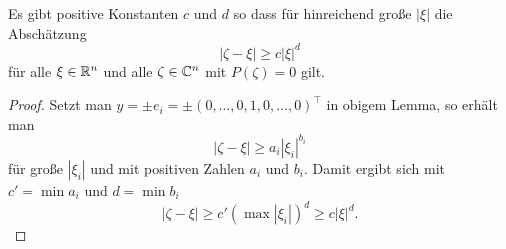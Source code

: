\begin{cor}\label{3.2lem2}
Es gibt positive Konstanten $c$ und $d$ so dass für hinreichend große $|\xi|$ die Abschätzung 
\begin{equation}
|\zeta- \xi|\ge c |\xi|^{d}
\end{equation} 
für alle $\xi\in\mathbb R^n$ und alle $\zeta\in\mathbb C^n$ mit $P(\zeta)=0$ gilt.
\end{cor} 
\begin{proof}
Setzt man $y=\pm e_i=\pm(0,\ldots, 0, 1, 0, \ldots, 0)^\top$ in obigem Lemma, so erhält man 
\begin{equation}
|\zeta-\xi|\ge a_i |\xi_i|^{b_i}
\end{equation}
für große $|\xi_i|$ und mit positiven Zahlen $a_i$ und $b_i$. Damit ergibt sich mit $c'=\min a_i$ und $d=\min b_i$ 
\begin{equation}
|\zeta - \xi|\ge c'(\max |\xi_i|)^d \ge c |\xi|^d.
\end{equation}
\end{proof}

